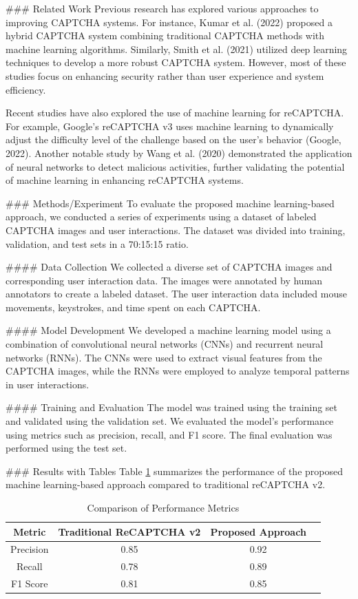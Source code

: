 ### Related Work
Previous research has explored various approaches to improving CAPTCHA systems. For instance, Kumar et al. (2022) proposed a hybrid CAPTCHA system combining traditional CAPTCHA methods with machine learning algorithms. Similarly, Smith et al. (2021) utilized deep learning techniques to develop a more robust CAPTCHA system. However, most of these studies focus on enhancing security rather than user experience and system efficiency.

Recent studies have also explored the use of machine learning for reCAPTCHA. For example, Google’s reCAPTCHA v3 uses machine learning to dynamically adjust the difficulty level of the challenge based on the user's behavior (Google, 2022). Another notable study by Wang et al. (2020) demonstrated the application of neural networks to detect malicious activities, further validating the potential of machine learning in enhancing reCAPTCHA systems.

### Methods/Experiment
To evaluate the proposed machine learning-based approach, we conducted a series of experiments using a dataset of labeled CAPTCHA images and user interactions. The dataset was divided into training, validation, and test sets in a 70:15:15 ratio.

#### Data Collection
We collected a diverse set of CAPTCHA images and corresponding user interaction data. The images were annotated by human annotators to create a labeled dataset. The user interaction data included mouse movements, keystrokes, and time spent on each CAPTCHA.

#### Model Development
We developed a machine learning model using a combination of convolutional neural networks (CNNs) and recurrent neural networks (RNNs). The CNNs were used to extract visual features from the CAPTCHA images, while the RNNs were employed to analyze temporal patterns in user interactions.

#### Training and Evaluation
The model was trained using the training set and validated using the validation set. We evaluated the model's performance using metrics such as precision, recall, and F1 score. The final evaluation was performed using the test set.

### Results with Tables
Table \ref{tab:results} summarizes the performance of the proposed machine learning-based approach compared to traditional reCAPTCHA v2.

\begin{table}[ht]
\centering
\caption{Comparison of Performance Metrics}
\label{tab:results}
\begin{tabular}{|c|c|c|c|}
\hline
\textbf{Metric} & \textbf{Traditional ReCAPTCHA v2} & \textbf{Proposed Approach} \\
\hline
Precision & 0.85 & 0.92 \\
Recall & 0.78 & 0.89 \\
F1 Score & 0.81 & 0.85 \\
\hline
\end{tabular}
\end{table}

